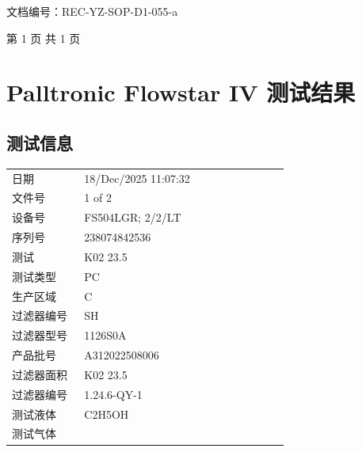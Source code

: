 \documentclass[UTF8,10pt,a4paper,fontset=fandol]{ctexart}
\newcommand{\fieldvalue}[1]{#1}
\begin{document}
\vspace{0.5em}

文档编号：REC-YZ-SOP-D1-055-a

\hfill 第 1 页 共 1 页

\newpage

\section{Palltronic Flowstar IV 测试结果}

\subsection{测试信息}

\begin{tabular}{@{}p{0.24\linewidth}p{0.68\linewidth}@{}}
日期 &
\fieldvalue{18/Dec/2025 11:07:32}
\\
文件号 &
\fieldvalue{1 of 2}
\\
设备号 &
\fieldvalue{FS504LGR; 2/2/LT}
\\
序列号 &
\fieldvalue{238074842536}
\\
测试 &
\fieldvalue{K02 23.5}
\\
测试类型 &
\fieldvalue{PC}
\\
生产区域 &
\fieldvalue{C}
\\
过滤器编号 &
\fieldvalue{SH}
\\
过滤器型号 &
\fieldvalue{1126S0A}
\\
产品批号 &
\fieldvalue{A312022508006}
\\
过滤器面积 &
\fieldvalue{K02 23.5}
\\
过滤器编号 &
\fieldvalue{1.24.6-QY-1}
\\
测试液体 &
\fieldvalue{C2H5OH}
\\
测试气体 &

\end{tabular}
\end{document}
